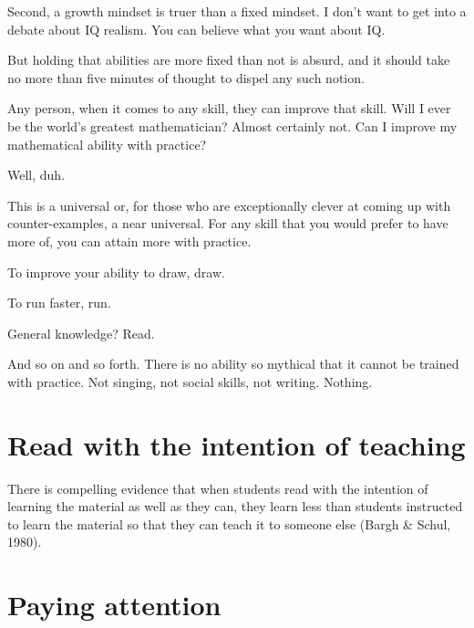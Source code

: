 Second, a growth mindset is truer than a fixed mindset. I don't want to get into
a debate about IQ realism. You can believe what you want about IQ.

But holding that abilities are more fixed than not is absurd, and it should take
no more than five minutes of thought to dispel any such notion.

Any person, when it comes to any skill, they can improve that skill. Will I ever
be the world's greatest mathematician? Almost certainly not. Can I improve my
mathematical ability with practice?

Well, duh.

This is a universal or, for those who are exceptionally clever at coming up with
counter-examples, a near universal. For any skill that you would prefer to have
more of, you can attain more with practice.

To improve your ability to draw, draw.

To run faster, run.

General knowledge? Read. 

And so on and so forth. There is no ability so mythical that it cannot be
trained with practice. Not singing, not social skills, not writing. Nothing.


\section{Read with the intention of teaching}
There is compelling evidence that when students read with the intention of learning the material as well as they can, they learn less than students instructed to learn the material so that they can teach it to someone else (Bargh & Schul, 1980).

\section{Paying attention}

